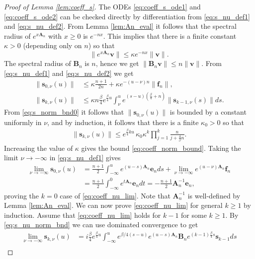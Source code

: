 \documentclass[12pt]{article}
\theoremstyle{definition} %
\theoremstyle{remark} %
\begin{document}
\begin{proof}[Proof of Lemma \ref{lem:coeff_s}]
The ODEs \eqref{eq:coeff_s_ode1} and   \eqref{eq:coeff_s_ode2} can be checked directly by differentiation from \eqref{eq:s_nu_def1} and \eqref{eq:s_nu_def2}.
 From Lemma \ref{lem:An_eval} it follows that the spectral radius of $e^{x \mathbf{A}_n}$ with $x\ge 0$ is $e^{-n x}$. This implies that there is a finite constant  $\kappa>0$ (depending only on $n$) so that
 \[
 \| e^{x \mathbf{A}_n} \mathbf{v}\|\le \kappa e^{-n x} \|\mathbf{v}\|.
 \]
The spectral radius of $\mathbf{B}_n$ is $n$, hence we get $\|\mathbf{B}_n \mathbf{v}\|\le n  \|\mathbf{v}\|$.
From \eqref{eq:s_nu_def1} and \eqref{eq:s_nu_def2}  we get
\begin{align}\label{eq:s_norm_bnd0}
    \|\mathbf{s}_{0,\nu}(u)\|&\le \kappa \frac{n+1}{2n}+\kappa e^{-(u-\nu)n} \|\mathbf{f}_n\|,\\
    \|\mathbf{s}_{k,\nu}(u)\|&\le \kappa n \frac{\beta}{4} e^{\frac{\beta}{4}u} \int_{\nu}^u e^{(s-u)(\frac{\beta}{4}+n)} \|\mathbf{s}_{k-1,\nu}(s)\| ds.
\end{align}
From \eqref{eq:s_norm_bnd0} it follows that $\|\mathbf{s}_{0,\nu}(u)\|$ is bounded by a constant uniformly in $\nu$, and by induction, it follows that there is a finite $\kappa_0>0$ so that 
\begin{align}\label{eq:s_nu_norm_bnd}
    \|\mathbf{s}_{k,\nu}(u)\|\le e^{\frac{\beta}{4} k u} \, \kappa_0 \kappa^k \prod_{j=1}^k\frac{n}{j+\frac{4}{\beta}n} .
\end{align}
Increasing the value of $\kappa$ gives the bound \eqref{eq:coeff_norm_bound}. 
Taking the limit $\nu\to -\infty$ in \eqref{eq:s_nu_def1} gives
\begin{align*}
  \lim_{\nu\to -\infty}   \mathbf{s}_{0,\nu}(u)&=\frac{n+1}{2}\int_{-\infty}^u e^{(u-s)\mathbf{A}_n} \mathbf{e}_nds+\lim_{\nu\to -\infty} e^{(u-\nu) \mathbf{A}_n }\mathbf{f}_n\\
  &=\frac{n+1}{2}\int_{-\infty}^0 e^{t \mathbf{A}_n} \mathbf{e}_ndt=-\frac{n+1}{2} \mathbf{A}_n^{-1} \mathbf{e}_n,
\end{align*}
proving the $k=0$ case of \eqref{eq:coeff_nu_lim}. 
Note that  
 $\mathbf{A}_n^{-1}$ is well-defined by Lemma \ref{lem:An_eval}. We can now prove  \eqref{eq:coeff_nu_lim} for general $k\ge 1$  by induction. Assume that \eqref{eq:coeff_nu_lim} holds for $k-1$ for some $k\ge 1$. 
By \eqref{eq:s_nu_norm_bnd} we can use dominated convergence to get
\begin{align*}
  \lim_{\nu\to -\infty}   \mathbf{s}_{k,\nu}(u)&=i \frac{\beta}{4}e^{\frac{\beta}{4} u}\int_{-\infty}^ue^{\beta/4 (s-u)}e^{(u-s)\mathbf{A}_n}\mathbf{B}_n e^{(k-1) \frac{\beta}{4}s}\mathbf{s}_{k-1}ds\\

\end{align*}
\end{proof}
\end{document}
